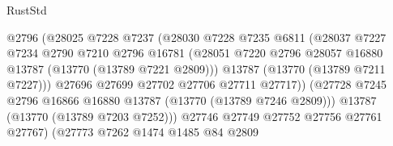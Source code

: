 \begin{lexlean}{RustStd}
\begin{coremodule}
                                        @2796
                                        (@28025
                                          @7228
                                          @7237
                                          (@28030
                                            @7228
                                            @7235
                                            @6811
                                            (@28037
                                              @7227
                                              @7234
                                              @2790
                                              @7210
                                              @2796
                                              @16781
                                              (@28051
                                                @7220
                                                @2796
                                                @28057
                                                @16880
                                                @13787
                                                (@13770 (@13789 @7221 @2809)))
                                              @13787
                                              (@13770 (@13789 @7211 @7227)))
                                            @27696
                                            @27699
                                            @27702
                                            @27706
                                            @27711
                                            @27717))
                                        (@27728
                                          @7245
                                          @2796
                                          @16866
                                          @16880
                                          @13787
                                          (@13770 (@13789 @7246 @2809)))
                                        @13787
                                        (@13770 (@13789 @7203 @7252)))
                                      @27746
                                      @27749
                                      @27752
                                      @27756
                                      @27761
                                      @27767)
                                    (@27773
                                      @7262
                                      @1474
                                      @1485
                                      @84
                                      @2809

\end{coremodule}
\end{lexlean}
